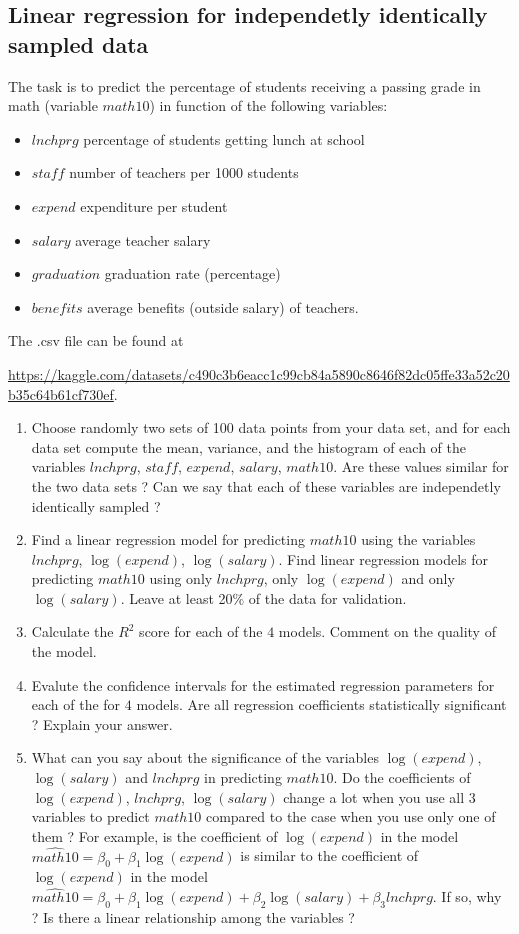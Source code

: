 \documentclass{article}
\begin{document}
 \subsection*{Linear regression for independetly identically sampled data}
    The task is to predict the percentage of students receiving a passing grade in math (variable $math10$) in function of 
    the following variables:
    \begin{itemize}
    \item{$lnchprg$}    
	    percentage of students getting lunch at school
     \item{$staff$}     
	    number of teachers per 1000 students
     \item{$expend$}    
	    expenditure per student
    \item{$salary$}
	    average teacher salary
    \item{$graduation$}
	    graduation rate (percentage)
    \item{$benefits$}
	    average benefits (outside salary) of teachers.
    \end{itemize}		    
     The .csv file can be found at  

     \url{https://kaggle.com/datasets/c490c3b6eacc1c99cb84a5890c8646f82dc05ffe33a52c20b35c64b61cf730ef}. 

  \begin{enumerate}
	 \item Choose randomly two sets of 100 data points from your data set, and for each data set compute the mean, variance, and the histogram
		 of each of the variables $lnchprg$, $staff$, $expend$, $salary$, $math10$. 
	Are these values similar for the two data sets ?  Can we say that each of these variables are independetly identically sampled ? 
\item Find a linear regression model for predicting $math10$ using the variables $lnchprg$, $\log(expend)$, $\log(salary)$. Find linear
	regression models for predicting $math10$ using only  $lnchprg$, only $\log(expend)$ and only $\log(salary)$. 
   Leave at least 20\% of the data for validation. 
  \item Calculate the $R^2$ score for each of the $4$ models. Comment on the quality of the model.
  \item Evalute the confidence intervals for the estimated regression parameters for each of the for $4$ models. Are all regression coefficients statistically significant ? Explain your answer.
   \item
	What can you say about the significance of the variables $\log(expend)$, $\log(salary)$ and $lnchprg$
	in predicting $math10$.
	Do the coefficients of $\log(expend)$, $lnchprg$, $\log(salary)$ change a lot when you use all $3$ variables to predict $math10$ 
	compared to the case when you use only one of them ? For example, is the coefficient
		  of $\log(expend)$ in the model $\widehat{math10}=\beta_0+\beta_1 \log(expend)$  
		    is similar to the coefficient of $\log(expend)$ in the model   $\widehat{math10}=\beta_0+\beta_1 \log(expend)+\beta_2 \log(salary)+\beta_3 lnchprg$.
	If so, why ? Is there a linear relationship among the variables ? 

 \end{enumerate}
\end{document}
